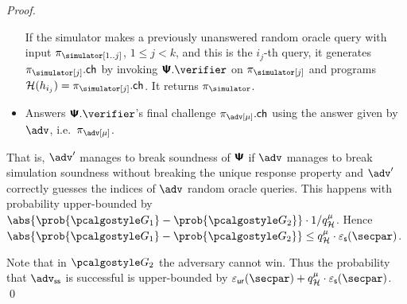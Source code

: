 \documentclass[runningheads,11pt]{llncs}
\begin{document}
\begin{proof}
\begin{itemize}
    If the simulator makes a previously unanswered random
    oracle query with input $\zkproof_\simulator[1..j]$, $1 \leq j < k$, and this is the $i_j$-th query, it generates $\zkproof_\simulator[j].\ch$ by
    invoking $\ps.\verifier$ on $\zkproof_\simulator[j]$ and programs
    $\ro(h_{i_j}) = \zkproof_\simulator[j].\ch$.
    It returns $\zkproof_\simulator$.
  \item Answers $\ps.\verifier$'s final challenge $\zkproof_\adv[\mu].\ch$ using the
    answer given by $\adv$, i.e.~$\zkproof_\adv[\mu]$.
  \end{itemize}
  That is, $\adv'$ manages to break soundness of $\bm{\mathsf{\Psi}}$ if $\adv$ manages to
  break simulation soundness without breaking the unique response property and
  $\adv'$ correctly guesses the indices of $\adv$ random oracle queries. This
  happens with probability upper-bounded by $\abs{\prob{\game{1}} -
    \prob{\game{2}}} \cdot \infrac{1}{q_\ro^{\mu}}$. Hence $\abs{\prob{\game{1}} -
    \prob{\game{2}}} \leq q_\ro^{\mu} \cdot \epss(\secpar)$.

  Note that in $\game{2}$ the adversary cannot win. Thus the probability
  that $\advss$ is successful is upper-bounded by
  $\epsur(\secpar) + q_{\ro}^{\mu} \cdot \epss(\secpar)$.  \qed
\end{proof}
\end{document}
